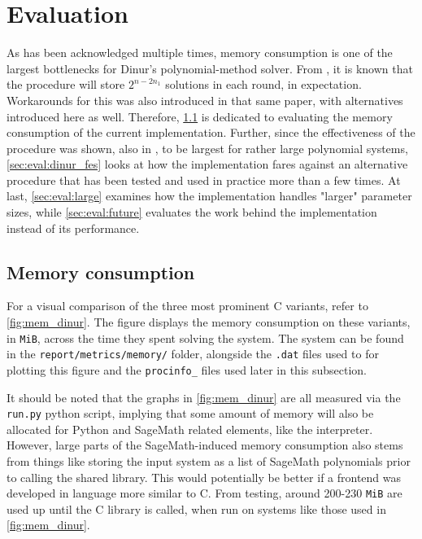 \section{Evaluation} \label{sec:eval}
As has been acknowledged multiple times, memory consumption is one of the largest bottlenecks for Dinur's polynomial-method solver. From \cite{eurocrypt-2021-30841}, it is known that the procedure will store $2^{n - 2n_1}$ solutions in each round, in expectation. Workarounds for this was also introduced in that same paper, with alternatives introduced here as well. Therefore, \cref{sec:eval:mem} is dedicated to evaluating the memory consumption of the current implementation. Further, since the effectiveness of the procedure was shown, also in \cite{eurocrypt-2021-30841}, to be largest for rather large polynomial systems, \cref{sec:eval:dinur_fes} looks at how the implementation fares against an alternative procedure that has been tested and used in practice more than a few times. At last, \cref{sec:eval:large} examines how the implementation handles "larger" parameter sizes, while \cref{sec:eval:future} evaluates the work behind the implementation instead of its performance.

\subsection{Memory consumption} \label{sec:eval:mem}

For a visual comparison of the three most prominent C variants, refer to \cref{fig:mem_dinur}. The figure displays the memory consumption on these variants, in \texttt{MiB}, across the time they spent solving the system. The system can be found in the \texttt{report/metrics/memory/} folder, alongside the \texttt{.dat} files used to for plotting this figure and the \texttt{procinfo\_} files used later in this subsection.

It should be noted that the graphs in \cref{fig:mem_dinur} are all measured via the \texttt{run.py} python script, implying that some amount of memory will also be allocated for Python and SageMath related elements, like the interpreter. However, large parts of the SageMath-induced memory consumption also stems from things like storing the input system as a list of SageMath polynomials prior to calling the shared library. This would potentially be better if a frontend was developed in language more similar to C. From testing, around 200-230 \texttt{MiB} are used up until the C library is called, when run on systems like those used in \cref{fig:mem_dinur}.

